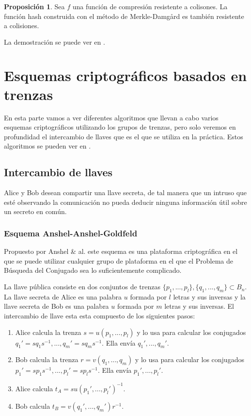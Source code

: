 \documentclass[12pt]{book}
\theoremstyle{definition}
\newtheorem{prop}{Proposición}[section]
\begin{document}
\begin{prop}
Sea $f$ una función de compresión resistente a colisones. La función hash construida con el método de Merkle-Damg\r{a}rd es también resistente a colisiones.
\end{prop}
La demostración se puede ver en \cite{in_cr}.



\section{Esquemas criptográficos basados en trenzas}

En esta parte vamos a ver diferentes algoritmos que llevan a cabo varios esquemas criptográficos utilizando los grupos de trenzas, pero solo veremos en profundidad el intercambio de llaves que es el que se utiliza en la práctica. Estos algoritmos se pueden ver en \cite{Deh}.

\subsection{Intercambio de llaves}
Alice y Bob desean compartir una llave secreta, de tal manera que un intruso que esté observando la comunicación no pueda deducir ninguna información útil sobre un secreto en común.

\subsubsection*{Esquema Anshel-Anshel-Goldfeld}
Propuesto por Anshel \& al. \cite{AAG} este esquema es una plataforma criptográfica en el que se puede utilizar cualquier grupo de plataforma en el que el Problema de Búsqueda del Conjugado sea lo suficientemente complicado.

La llave pública consiste en dos conjuntos de trenzas $\{p_1,...,p_l\},\{q_1,...,q_m\}\subset B_n$. La llave secreta de Alice es una palabra $u$ formada por $l$ letras y sus inversas y la llave secreta de Bob es una palabra $u$ formada por $m$ letras y sus inversas. El intercambio de llave esta esta compuesto de los siguientes pasos:

\begin{enumerate}
\item Alice calcula la trenza $s = u(p_1,...,p_l)$ y lo usa para calcular los conjugados $q_1'=sq_1s^{-1},...,q_m'=sq_ms^{-1}$. Ella envía $q_1',...,q_m'.$
\item Bob calcula la trenza $r = v(q_1,...,q_m)$ y lo usa para calcular los conjugados $p_1'=sp_1s^{-1},...,p_l'=sp_ls^{-1}$. Ella envía $p_1',...,p_l'.$
\item Alice calcula $t_A = su(p_1',...,p_l')^{-1}$.
\item Bob calcula $t_B = v(q_1',...,q_m')r^{-1}$.
\end{enumerate}
\end{document}
